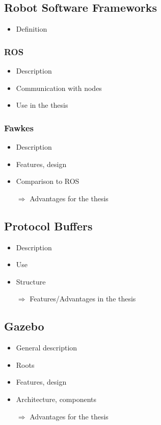 \documentclass[a4paper,11pt]{article}
\begin{document}
\subsection{Robot Software Frameworks}
\begin{itemize}
\item Definition
\end{itemize}
\subsubsection{ROS}
\begin{itemize}
\item Description
\item Communication with nodes
\item Use in the thesis
\end{itemize}
\subsubsection{Fawkes}
\begin{itemize}
\item Description
\item Features, design
\item Comparison to ROS
\item[$\Rightarrow$] Advantages for the thesis
\end{itemize}
\subsection{Protocol Buffers}
\begin{itemize}
\item Description
\item Use
\item Structure
\item[$\Rightarrow$] Features/Advantages in the thesis
\end{itemize}
\subsection{Gazebo}
\begin{itemize}
\item General description
\item Roots
\item Features, design
\item Architecture, components
\item[$\Rightarrow$] Advantages for the thesis
\end{itemize}
\end{document}
